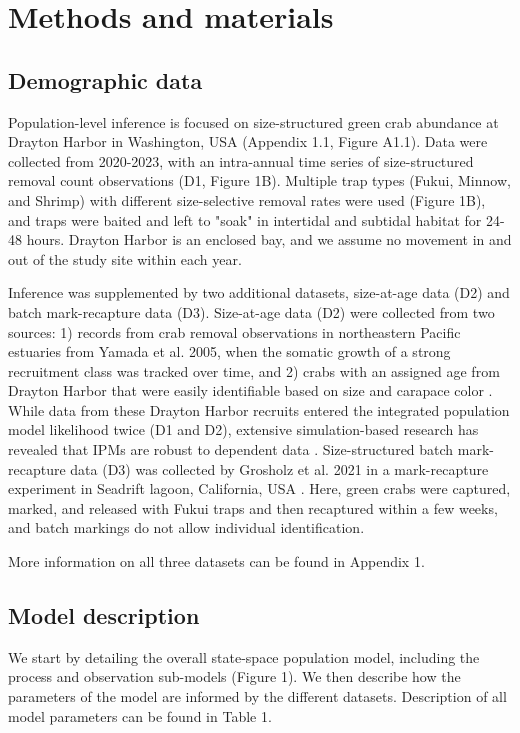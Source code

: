 \documentclass{article}
\begin{document}
\section{Methods and materials}

\subsection{Demographic data}

Population-level inference is focused on size-structured green crab abundance at Drayton Harbor in Washington, USA (Appendix 1.1, Figure A1.1). Data were collected from 2020-2023, with an intra-annual time series of size-structured removal count observations (D1, Figure 1B). Multiple trap types (Fukui, Minnow, and Shrimp) with different size-selective removal rates were used (Figure 1B), and traps were baited and left to "soak" in intertidal and subtidal habitat for 24-48 hours. Drayton Harbor is an enclosed bay, and we assume no movement in and out of the study site within each year. 

Inference was supplemented by two additional datasets, size-at-age data (D2) and batch mark-recapture data (D3). Size-at-age data (D2) were collected from two sources: 1) records from crab removal observations in northeastern Pacific estuaries from Yamada et al. 2005, when the somatic growth of a strong recruitment class was tracked over time, and 2) crabs with an assigned age from Drayton Harbor that were easily identifiable based on size and carapace color \parencite{yamada2005growth}. While data from these Drayton Harbor recruits entered the integrated population model likelihood twice (D1 and D2), extensive simulation-based research has revealed that IPMs are robust to dependent data \parencite{abadi2010assessment}. Size-structured batch mark-recapture data (D3) was collected by Grosholz et al. 2021 in a mark-recapture experiment in Seadrift lagoon, California, USA \parencite{grosholz2021stage}. Here, green crabs were captured, marked, and released with Fukui traps and then recaptured within a few weeks, and batch markings do not allow individual identification. 

More information on all three datasets can be found in Appendix 1. 

\subsection{Model description}

We start by detailing the overall state-space population model, including the process and observation sub-models (Figure 1). We then describe how the parameters of the model are informed by the different datasets. Description of all model parameters can be found in Table 1.
\end{document}

